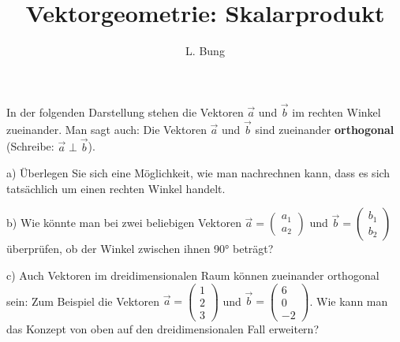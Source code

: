 \documentclass[11pt, a4paper, oneside]{article}
\begin{document}
	\author{L. Bung}
	\title{Vektorgeometrie: Skalarprodukt}
	\subject{Mathematik}
	\maketitle
	
	
	In der folgenden Darstellung stehen die Vektoren $\vec{a}$ und $\vec{b}$ im rechten Winkel zueinander.
	Man sagt auch: Die Vektoren $\vec{a}$ und $\vec{b}$ sind zueinander \textbf{orthogonal} (Schreibe: $\vec{a}\perp\vec{b}$).
	
	\begin{figure}[H]
		\centering
	\end{figure}

	a) Überlegen Sie sich eine Möglichkeit, wie man nachrechnen kann, dass es sich tatsächlich um einen rechten Winkel handelt.
	
	\checkered[10cm]
	
	b) Wie könnte man bei zwei beliebigen Vektoren $\vec{a} = \begin{pmatrix}a_1\\a_2\end{pmatrix}$ und $\vec{b}=\begin{pmatrix}b_1\\b_2\end{pmatrix}$ überprüfen, ob der Winkel zwischen ihnen 90° beträgt?
	
	\checkered
	
	c) Auch Vektoren im dreidimensionalen Raum können zueinander orthogonal sein:
	Zum Beispiel die Vektoren $\vec{a} = \begin{pmatrix}1\\2\\3\end{pmatrix}$ und $\vec{b} = \begin{pmatrix}6\\0\\-2\end{pmatrix}$.
	Wie kann man das Konzept von oben auf den dreidimensionalen Fall erweitern?
	
	\checkered
	
	\boxarea[9cm]
\end{document}

